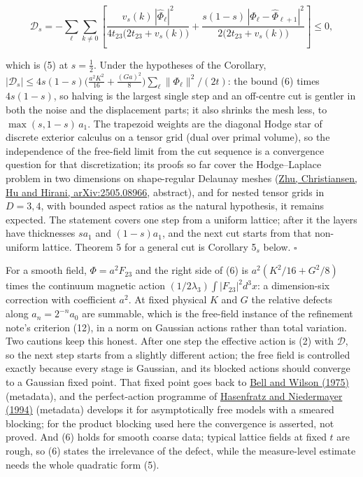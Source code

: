\documentclass[11pt,a4paper]{article}
\begin{document}
\[\mathcal D_s=-\sum_\ell\sum_{k\ne0}\left[
\frac{v_s(k)\,|\hat\Phi_\ell|^2}{4t_{23}\bigl(2t_{23}+v_s(k)\bigr)}
+\frac{s(1-s)\,|\hat\Phi_\ell-\hat\Phi_{\ell+1}|^2}{2\bigl(2t_{23}+v_s(k)\bigr)}
\right]\le0,\]

which is (5) at \(s=\frac12\). Under the hypotheses of the Corollary,
\(|\mathcal D_s|\le4s(1-s)\bigl(\frac{a^2K^2}{16}+\frac{(Ga)^2}8\bigr)\sum_\ell\|\Phi_\ell\|^2/(2t)\):
the bound (6) times \(4s(1-s)\), so halving is the largest single step
and an off-centre cut is gentler in both the noise and the displacement
parts; it also shrinks the mesh less, to \(\max(s,1-s)\,a_1\). The
trapezoid weights are the diagonal Hodge star of discrete exterior
calculus on a tensor grid (dual over primal volume), so the independence
of the free-field limit from the cut sequence is a convergence question
for that discretization; its proofs so far cover the Hodge--Laplace
problem in two dimensions on shape-regular Delaunay meshes
(\href{https://arxiv.org/abs/2505.08966}{Zhu, Christiansen, Hu and
Hirani, arXiv:2505.08966}, abstract), and for nested tensor grids in
\(D=3,4\), with bounded aspect ratios as the natural hypothesis, it
remains expected. The statement covers one step from a uniform lattice;
after it the layers have thicknesses \(sa_1\) and \((1-s)a_1\), and the
next cut starts from that non-uniform lattice. Theorem 5 for a general
cut is Corollary 5\(_s\) below. \(\square\)

For a smooth field, \(\Phi=a^2F_{23}\) and the right side of (6) is
\(a^2(K^2/16+G^2/8)\) times the continuum magnetic action
\((1/2\lambda_3)\int|F_{23}|^2d^3x\): a dimension-six correction with
coefficient \(a^2\). At fixed physical \(K\) and \(G\) the relative
defects along \(a_n=2^{-n}a_0\) are summable, which is the free-field
instance of the refinement note's criterion (12), in a norm on Gaussian
actions rather than total variation. Two cautions keep this honest.
After one step the effective action is (2) with \(\mathcal D\), so the
next step starts from a slightly different action; the free field is
controlled exactly because every stage is Gaussian, and its blocked
actions should converge to a Gaussian fixed point. That fixed point goes
back to \href{https://doi.org/10.1103/PhysRevB.11.3431}{Bell and Wilson
(1975)} (metadata), and the perfect-action programme of
\href{https://doi.org/10.1016/0550-3213(94)90261-5}{Hasenfratz and
Niedermayer (1994)} (metadata) develops it for asymptotically free
models with a smeared blocking; for the product blocking used here the
convergence is asserted, not proved. And (6) holds for smooth coarse
data; typical lattice fields at fixed \(t\) are rough, so (6) states the
irrelevance of the defect, while the measure-level estimate needs the
whole quadratic form (5).
\end{document}
